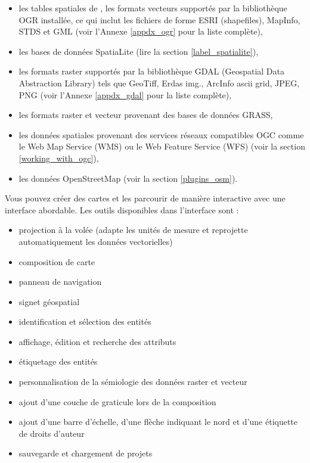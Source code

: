 \begin{itemize}[label=--]
\item les tables spatiales de \ppg, les formats vecteurs supportés par la bibliothèque OGR installée, ce qui inclut les fichiers de forme ESRI (shapefiles), MapInfo, STDS et GML (voir l'Annexe \ref{appdx_ogr} pour la liste complète),
\item les bases de données SpatiaLite (lire la section \ref{label_spatialite}),
\item les formats raster supportés par la bibliothèque GDAL (Geospatial Data Abstraction Library) tels que GeoTiff, Erdas img., ArcInfo ascii grid, JPEG, PNG (voir l'Annexe \ref{appdx_gdal} pour la liste complète),
\item les formats raster et vecteur provenant des bases de données GRASS, 
\item les données spatiales provenant des services réseaux compatibles OGC comme le Web Map Service (WMS) ou le Web Feature Service (WFS) (voir la  section \ref{working_with_ogc}),
\item les données OpenStreetMap (voir la section \ref{plugins_osm}).
\end{itemize}


Vous pouvez créer des cartes et les parcourir de manière interactive avec une interface abordable. Les outils disponibles dans l'interface sont :

\begin{itemize}[label=--]
\item projection à la volée (adapte les unités de mesure et reprojette automatiquement les données vectorielles)
\item composition de carte
\item panneau de navigation
\item signet géospatial
\item identification et sélection des entités
\item affichage, édition et recherche des attributs
\item étiquetage des entités
\item personnalisation de la sémiologie des données raster et vecteur
\item ajout d'une couche de graticule lors de la composition
\item ajout d'une barre d'échelle, d'une flèche indiquant le nord et d'une étiquette de droits d'auteur
\item sauvegarde et chargement de projets
\end{itemize}

